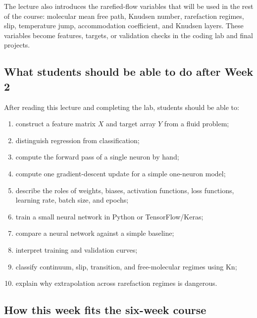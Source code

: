 \documentclass[11pt]{article}
\newcommand{\kn}{\mathrm{Kn}}
\begin{document}
The lecture also introduces the rarefied-flow variables that will be used in the rest of the course: molecular mean free path, Knudsen number, rarefaction regimes, slip, temperature jump, accommodation coefficient, and Knudsen layers.  These variables become features, targets, or validation checks in the coding lab and final projects.

\subsection*{What students should be able to do after Week 2}

After reading this lecture and completing the lab, students should be able to:
\begin{enumerate}
    \item construct a feature matrix $X$ and target array $Y$ from a fluid problem;
    \item distinguish regression from classification;
    \item compute the forward pass of a single neuron by hand;
    \item compute one gradient-descent update for a simple one-neuron model;
    \item describe the roles of weights, biases, activation functions, loss functions, learning rate, batch size, and epochs;
    \item train a small neural network in Python or TensorFlow/Keras;
    \item compare a neural network against a simple baseline;
    \item interpret training and validation curves;
    \item classify continuum, slip, transition, and free-molecular regimes using $\kn$;
    \item explain why extrapolation across rarefaction regimes is dangerous.
\end{enumerate}

\subsection*{How this week fits the six-week course}
\end{document}
